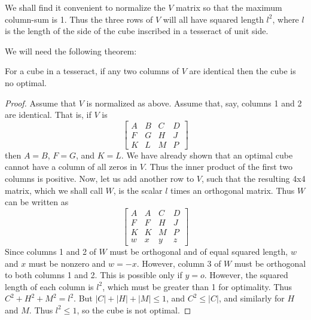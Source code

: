 We shall find it convenient to normalize the $V$ matrix so that the maximum
column-sum is 1.  Thus the three rows of $V$ will all have squared length
$l^2$, where $l$ is the length of the side of the cube inscribed in a
tesseract of unit side.

We will need the following theorem:
\begin{theorem}
For a cube in a tesseract, if any two columns of $V$ are identical then the
cube is no optimal.
\label{refpage12}
\end{theorem}
\begin{proof}
Assume that $V$ is normalized as above.  Assume that, say, columns 1 and 2 are
identical.  That is, if $V$ is
\begin{equation*}
\begin{bmatrix}
A & B & C & D \\
F & G & H & J \\
K & L & M & P
\end{bmatrix}
\end{equation*}
then $A = B$, $F = G$, and $K = L$. We have already shown that an optimal cube
cannot have a column of all zeros in $V$. Thus the inner product of the first
two columns is positive. Now, let us add another row to $V$, such that the
resulting 4x4 matrix, which we shall call $W$, is the scalar $l$ times an
orthogonal matrix. Thus $W$ can be written as
\begin{equation*}
\begin{bmatrix}
A & A & C & D \\
F & F & H & J \\
K & K & M & P \\
w & x & y & z
\end{bmatrix}
\end{equation*}
Since columns 1 and 2 of $W$ must be orthogonal and of equal squared
length, $w$ and $x$ must be nonzero and $w = -x$. However, column 3 of $W$ must
be orthogonal to both columns 1 and 2. This is possible only if $y = o$.
However, the squared length of each column is $l^2$, which must be greater
than 1 for optimality. Thus $C^2+H^2+M^2 = l^2$. But $|C|+|H|+|M| \leq 1$,
and $C^2 \leq |C|$, and similarly for $H$ and $M$. Thus $l^2 \leq 1$, so the
cube is not optimal.
\end{proof}

